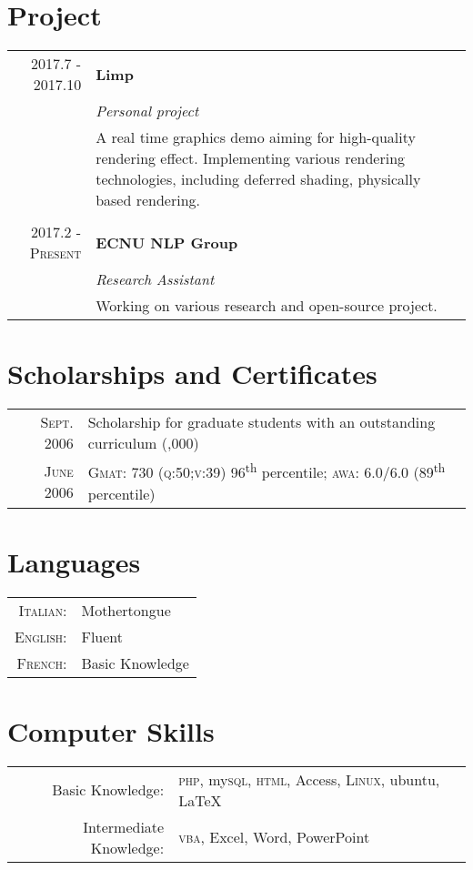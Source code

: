 \documentclass[a4paper,10pt]{article}
\begin{document}
	\section{Project}
	\begin{tabular}{r|p{11cm}}
		\textsc{2017.7 - 2017.10} & \textbf{Limp}\\&\emph{Personal project}\\&\footnotesize{A real time graphics demo aiming for high-quality rendering effect. Implementing various rendering technologies, including deferred shading, physically based rendering.}\\\multicolumn{2}{c}{} \\
		\textsc{2017.2 - Present} & \textbf{ECNU NLP Group}\\&\emph{Research Assistant}\\&\footnotesize{Working on various research and open-source project.}
	\end{tabular}
	
	
	\section{Scholarships and Certificates}
	\begin{tabular}{rl}
		\textsc{Sept.} 2006 & Scholarship for graduate students with an outstanding curriculum \footnotesize(\EURcr 30,000)\normalsize\\
		\textsc{June} 2006 & {\textsc{Gmat}\textregistered}\setmainfont[SmallCapsFont=Fontin-SmallCaps.otf]{Fontin.otf}: 730 (\textsc{q:50;v:39}) 96\textsuperscript{th} percentile; \textsc{awa}: 6.0/6.0 (89\textsuperscript{th} percentile)
	\end{tabular}
	
	\section{Languages}
	\begin{tabular}{rl}
		\textsc{Italian:}&Mothertongue\\
		\textsc{English:}&Fluent\\
		\textsc{French:}&Basic Knowledge\\
	\end{tabular}
	
	\section{Computer Skills}
	\begin{tabular}{rl}
		Basic Knowledge:& \textsc{php}, my\textsc{sql}, \textsc{html}, Access, \textsc{Linux}, ubuntu, {\fb \LaTeX}\setmainfont[SmallCapsFont=Fontin-SmallCaps.otf]{Fontin.otf}\\
		Intermediate Knowledge:& \textsc{vba}, Excel, Word, PowerPoint\\
	\end{tabular}
	
\end{document}

